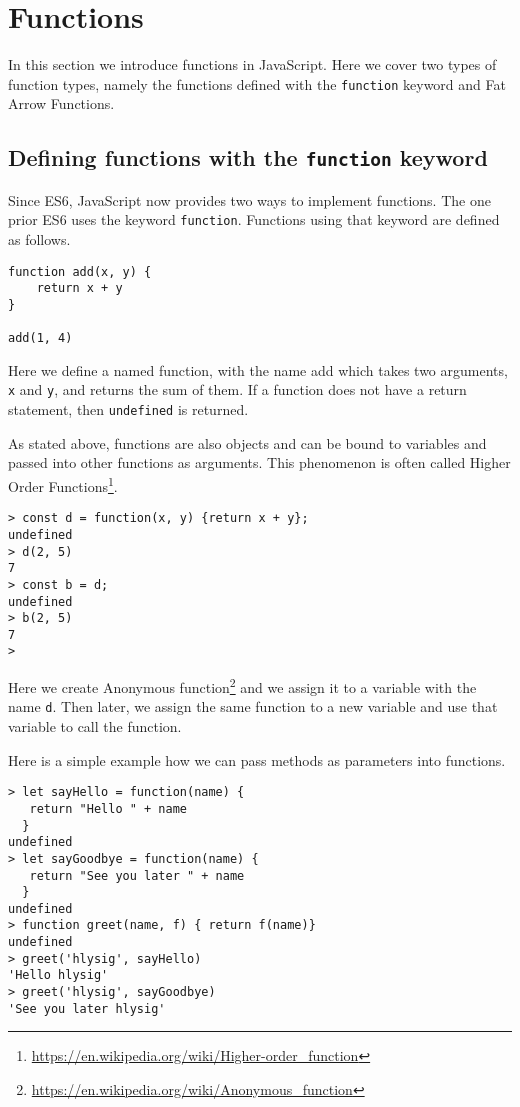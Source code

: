 \section{Functions}\label{sec:functions}
In this section we introduce functions in JavaScript. Here we cover two types of function types, namely the functions defined with the \texttt{function} keyword and Fat Arrow Functions.

\subsection{Defining functions with the \texttt{function} keyword}
Since ES6, JavaScript now provides two ways to implement functions. The one prior ES6 uses the keyword \texttt{function}. Functions using that keyword are defined as follows.

\begin{lstlisting}
function add(x, y) {
    return x + y
}

add(1, 4)
\end{lstlisting}

Here we define a named function, with the name add which takes two arguments, \texttt{x} and \texttt{y}, and returns the sum of them. If a function does not have a return statement, then \texttt{undefined} is returned.

As stated above, functions are also objects and can be bound to variables and passed into other functions as arguments. This phenomenon is often called Higher Order Functions\footnote{\url{https://en.wikipedia.org/wiki/Higher-order_function}}.

\begin{lstlisting}
> const d = function(x, y) {return x + y};
undefined
> d(2, 5)
7
> const b = d;
undefined
> b(2, 5)
7
>
\end{lstlisting}

Here we create Anonymous function\footnote{\url{https://en.wikipedia.org/wiki/Anonymous_function}} and we assign it to a variable with the name \texttt{d}. Then later, we assign the same function to a new variable and use that variable to call the function.

Here is a simple example how we can pass methods as parameters into functions.

\begin{lstlisting}
> let sayHello = function(name) { 
   return "Hello " + name
  }
undefined
> let sayGoodbye = function(name) {
   return "See you later " + name
  }
undefined
> function greet(name, f) { return f(name)}
undefined
> greet('hlysig', sayHello)
'Hello hlysig'
> greet('hlysig', sayGoodbye)
'See you later hlysig'
\end{lstlisting}

